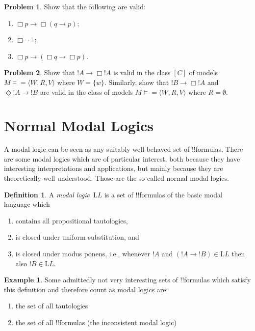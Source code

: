 \documentclass[10pt,a4paper]{article}
\theoremstyle{plain}
\theoremstyle{definition}
\newtheorem{defn}[thm]{Definition}
\newtheorem{ex}[thm]{Example}
\newtheorem{prob}{Problem}[section]
\theoremstyle{remark}
\newcommand*{\olfileid}[3]{}
\newcommand*{\olsection}[1]{\section*{#1}}
\newcommand*{\ollabel}[1]{\label{#1}}
\providecommand{\lif}{\mathbin{\rightarrow}}
\providecommand{\lfalse}{\bot}
\providecommand{\mModel}[2]{\ensuremath{#1 \models #2}}
\providecommand{\Log}{\ensuremath{\mathrm{L}}}
\providecommand{\tuple}[1]{\langle #1 \rangle}
\providecommand{\mClass}[1]{[#1]}
\begin{document}
\begin{prob}
  Show that the following are valid:
  \begin{enumerate}
  \item $\Box p \lif \Box (q \lif p)$;
  \item $\Box \lnot \lfalse$;
  \item $\Box p \lif (\Box q \lif \Box p)$.
  \end{enumerate}
\end{prob}

\begin{prob}
  Show that $!A \lif \Box!A$ is valid in the class $\mClass{C}$ of
  models $\mModel{M} = \tuple{W, R, V}$ where $W = \{w\}$. Similarly,
  show that $!B \lif \Box !A$ and $\Diamond !A \lif !B$ are valid in
  the class of models $\mModel{M} = \tuple{W, R, V}$ where
  $R = \emptyset$.
\end{prob}





\olfileid{nml}{syn}{nor}

\olsection{Normal Modal Logics}

A modal logic can be seen as any suitably well-behaved set of
!!{formula}s.  There are some modal logics which are of particular
interest, both because they have interesting interpretations and
applications, but mainly because they are theoretically well
understood.  Those are the so-called normal modal logics.

\begin{defn}\ollabel{defn:modal-logic}
A \emph{modal logic}~$\Log L$ is a set of !!{formula}s of the basic
modal language which 
\begin{enumerate}
\item contains all propositional tautologies, 
\item is closed under uniform substitution, and 
\item is closed under modus ponens, i.e., whenever $!A$ and $(!A \lif
  !B) \in \Log L$ then also $!B \in \Log L$.
\end{enumerate}
\end{defn}

\begin{ex}
Some admittedly not very interesting sets of !!{formula}s which
satisfy this definition and therefore count as modal logics are:
\begin{enumerate}
\item the set of all tautologies
\item the set of all !!{formula}s (the inconsistent modal logic)
\end{enumerate}
\end{ex}
\end{document}
